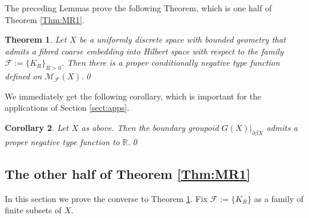 \documentclass[preprint]{elsarticle}
\theoremstyle{plain}
\newtheorem{theorem}{Theorem}%
\newtheorem{corollary}[theorem]{Corollary}%
\theoremstyle{definition}%
\theoremstyle{remark}%
\begin{document}
The preceding Lemmas prove the following Theorem, which is one half of Theorem \ref{Thm:MR1}.

\begin{theorem}\label{Thm:MT2}
Let $X$ be a uniformly discrete space with bounded geometry that admits a fibred coarse embedding into Hilbert space with respect to the family $\mathcal{F}:=\lbrace K_{R} \rbrace_{R>0}$. Then there is a proper conditionally negative type function defined on $\mathcal{M}_{\mathcal{F}}(X)$.\qed
\end{theorem}

We immediately get the following corollary, which is important for the applications of Section \ref{sect:apps}.

\begin{corollary}\label{thm:MT1-a}
Let $X$ as above. Then the boundary groupoid $G(X)|_{\partial\beta X}$ admits a proper negative type function to $\mathbb{R}$.\qed
\end{corollary}

\subsection{The other half of Theorem \ref{Thm:MR1}}

In this section we prove the converse to Theorem \ref{Thm:MT2}. Fix $\mathcal{F}:=\lbrace K_{R} \rbrace$ as a family of finite subsets of $X$.
\end{document}
